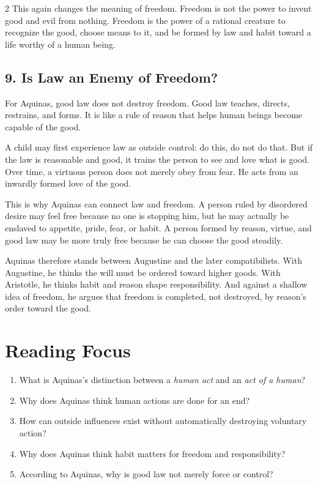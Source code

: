 \documentclass[12pt]{article}
\begin{document}
\begin{multicols}{2}
This again changes the meaning of freedom. Freedom is not the power to invent good and evil from nothing. Freedom is the power of a rational creature to recognize the good, choose means to it, and be formed by law and habit toward a life worthy of a human being.

\subsection*{9. Is Law an Enemy of Freedom?}
For Aquinas, good law does not destroy freedom. Good law teaches, directs, restrains, and forms. It is like a rule of reason that helps human beings become capable of the good.

A child may first experience law as outside control: do this, do not do that. But if the law is reasonable and good, it trains the person to see and love what is good. Over time, a virtuous person does not merely obey from fear. He acts from an inwardly formed love of the good.

This is why Aquinas can connect law and freedom. A person ruled by disordered desire may feel free because no one is stopping him, but he may actually be enslaved to appetite, pride, fear, or habit. A person formed by reason, virtue, and good law may be more truly free because he can choose the good steadily.

Aquinas therefore stands between Augustine and the later compatibilists. With Augustine, he thinks the will must be ordered toward higher goods. With Aristotle, he thinks habit and reason shape responsibility. And against a shallow idea of freedom, he argues that freedom is completed, not destroyed, by reason's order toward the good.

\section*{Reading Focus}
\begin{enumerate}[leftmargin=*]
\item What is Aquinas's distinction between a \textit{human act} and an \textit{act of a human}?
\item Why does Aquinas think human actions are done for an end?
\item How can outside influences exist without automatically destroying voluntary action?
\item Why does Aquinas think habit matters for freedom and responsibility?
\item According to Aquinas, why is good law not merely force or control?
\end{enumerate}


\end{multicols}
\end{document}
